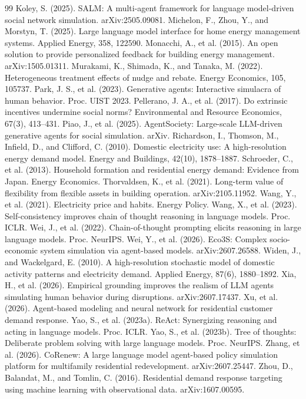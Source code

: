 \documentclass[11pt]{article}
\begin{document}
\begin{thebibliography}{99}
 Koley, S. (2025). SALM: A multi-agent framework for language model-driven social network simulation. arXiv:2505.09081.
 Michelon, F., Zhou, Y., and Morstyn, T. (2025). Large language model interface for home energy management systems. Applied Energy, 358, 122590.
 Monacchi, A., et al. (2015). An open solution to provide personalized feedback for building energy management. arXiv:1505.01311.
 Murakami, K., Shimada, K., and Tanaka, M. (2022). Heterogeneous treatment effects of nudge and rebate. Energy Economics, 105, 105737.
 Park, J. S., et al. (2023). Generative agents: Interactive simulacra of human behavior. Proc. UIST 2023.
 Pellerano, J. A., et al. (2017). Do extrinsic incentives undermine social norms? Environmental and Resource Economics, 67(3), 413--431.
 Piao, J., et al. (2025). AgentSociety: Large-scale LLM-driven generative agents for social simulation. arXiv.
 Richardson, I., Thomson, M., Infield, D., and Clifford, C. (2010). Domestic electricity use: A high-resolution energy demand model. Energy and Buildings, 42(10), 1878--1887.
 Schroeder, C., et al. (2013). Household formation and residential energy demand: Evidence from Japan. Energy Economics.
 Thorvaldsen, K., et al. (2021). Long-term value of flexibility from flexible assets in building operation. arXiv:2105.11952.
 Wang, Y., et al. (2021). Electricity price and habits. Energy Policy.
 Wang, X., et al. (2023). Self-consistency improves chain of thought reasoning in language models. Proc. ICLR.
 Wei, J., et al. (2022). Chain-of-thought prompting elicits reasoning in large language models. Proc. NeurIPS.
 Wei, Y., et al. (2026). Eco3S: Complex socio-economic system simulation via agent-based models. arXiv:2607.26588.
 Widen, J., and Wackelgard, E. (2010). A high-resolution stochastic model of domestic activity patterns and electricity demand. Applied Energy, 87(6), 1880--1892.
 Xia, H., et al. (2026). Empirical grounding improves the realism of LLM agents simulating human behavior during disruptions. arXiv:2607.17437.
 Xu, et al. (2026). Agent-based modeling and neural network for residential customer demand response.
 Yao, S., et al. (2023a). ReAct: Synergizing reasoning and acting in language models. Proc. ICLR.
 Yao, S., et al. (2023b). Tree of thoughts: Deliberate problem solving with large language models. Proc. NeurIPS.
 Zhang, et al. (2026). CoRenew: A large language model agent-based policy simulation platform for multifamily residential redevelopment. arXiv:2607.25447.
 Zhou, D., Balandat, M., and Tomlin, C. (2016). Residential demand response targeting using machine learning with observational data. arXiv:1607.00595.
\end{thebibliography}
\end{document}

